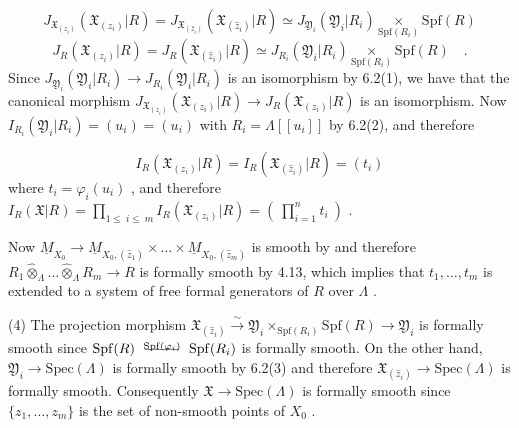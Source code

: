 \begin{equation*}
J_{\mathfrak{X}_{(z_i)}}(\mathfrak{X}_{(z_i)}|R) = J_{\mathfrak{X}_{(\widehat{z}_i)}}(\mathfrak{X}_{(\widehat{z}_i)}|R) \simeq J_{\mathfrak{Y}_i}(\mathfrak{Y}_i|R_i) \underset{\mathrm{Spf}(R_i)}{\times} \mathrm{Spf}(R)
\end{equation*}
\begin{equation*}
J_R(\mathfrak{X}_{(z_i)}|R) = J_R(\mathfrak{X}_{(\widehat{z}_i)}|R) \simeq J_{R_i}(\mathfrak{Y}_i|R_i) \underset{\mathrm{Spf}(R_i)}{\times} \mathrm{Spf}(R) \quad .
\end{equation*}
Since $J_{\mathfrak{Y}_i}(\mathfrak{Y}_i|R_i) \to J_{R_i}(\mathfrak{Y}_i|R_i)$ is an isomorphism by 6.2(1), we have that the canonical morphism $J_{\mathfrak{X}_{(z_i)}}(\mathfrak{X}_{(z_i)}|R) \to J_R(\mathfrak{X}_{(z_i)}|R)$ is an isomorphism. Now $I_{R_i}(\mathfrak{Y}_i|R_i) = (u_i) = (u_i)$ with $R_i = \Lambda[[u_i]]$ by 6.2(2), and therefore

\begin{equation*}
I_R(\mathfrak{X}_{(z_i)}|R) = I_R(\mathfrak{X}_{(\widehat{z}_i)}|R) = (t_i)
\end{equation*}
where $t_i = \varphi_i(u_i)$ , and therefore $I_R(\mathfrak{X}|R) = \prod_{1\leq\ i\leq\ m} I_R(\mathfrak{X}_{(z_i)}|R) = (\ \prod_{i=1}^{n} t_i\ )$ .

Now $\underline{M}_{X_0} \to \underline{M}_{X_0,(\widehat{z}_1)} \times \ldots \times \underline{M}_{X_0,(\widehat{z}_m)}$ is smooth by and therefore $R_1 \hat{\otimes}_{\Lambda} \ldots \hat{\otimes}_{\Lambda} R_m \to R$ is formally smooth by 4.13, which implies that $t_1,\ldots,t_m$ is extended to a system of free formal generators of $R$ over $\Lambda$ .



(4)  The projection morphism  $\mathfrak{X}_{(\widehat{z}_i)} \overset{\sim}{\rightarrow} \mathfrak{Y}_i \times_{\mathrm{Spf}(R_i)} \mathrm{Spf}(R) \rightarrow \mathfrak{Y}_i$  is formally smooth since  $\mathrm{Spf}(R) \overset{\ \mathrm{Spf}(\varphi_i)\ }{\relbar\joinrel\relbar\joinrel\relbar\joinrel\relbar} \mathrm{Spf}(R_i)$  is formally smooth. On the other hand, $\mathfrak{Y}_i \rightarrow \mathrm{Spec}(\Lambda)$  is formally smooth by 6.2(3)  and therefore  $\mathfrak{X}_{(\widehat{z}_i)} \rightarrow \mathrm{Spec}(\Lambda)$  is formally smooth. Consequently  $\mathfrak{X} \rightarrow \mathrm{Spec}(\Lambda)$  is formally smooth since  $\{z_1,\dots,z_m\}$  is the set of non-smooth points of  $X_0$ .

